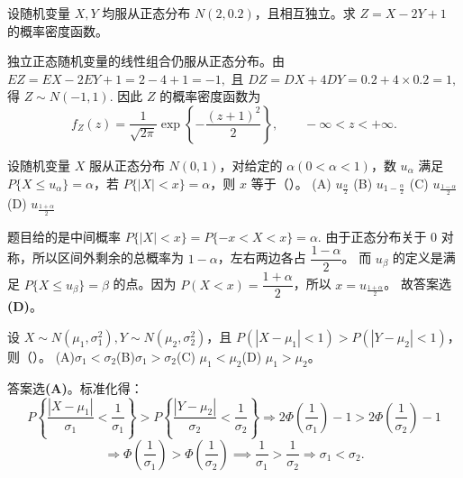 \documentclass[lang=cn,11pt]{elegantbook}
\begin{document}
\begin{exercise}\label{exer:src-2015-spring-a-i-03}
设随机变量 \(X,Y\) 均服从正态分布 \(N(2,0.2)\)，且相互独立。求
\(
Z=X-2Y+1
\)
的概率密度函数。
\end{exercise}
\begin{solution}
独立正态随机变量的线性组合仍服从正态分布。由
\(
EZ=EX-2EY+1=2-4+1=-1,
\)
且
\(
DZ=DX+4DY=0.2+4\times0.2=1,
\)
得
\(
Z\sim N(-1,1).
\)
因此 \(Z\) 的概率密度函数为
\[
f_Z(z)=\frac1{\sqrt{2\pi}}\exp\!\left\{-\frac{(z+1)^2}{2}\right\},
\qquad -\infty<z<+\infty.
\]
\end{solution}


\begin{exercise}\label{exer:2-12}\label{exer:src-2017-a-ii-05}
设随机变量 $X$ 服从正态分布 $N(0,1)$，对给定的 $\alpha(0<\alpha<1)$，数 $u_\alpha$ 满足 $P\{X\le u_\alpha\} = \alpha$，若 $P\{|X|<x\} = \alpha$，则 $x$ 等于（\quad）。
(A) $u_{\frac{\alpha}{2}}$ \quad (B) $u_{1-\frac{\alpha}{2}}$ \quad (C) $u_{\frac{1-\alpha}{2}}$ \quad (D) $u_{\frac{1+\alpha}{2}}$
\end{exercise}

\begin{solution}
题目给的是中间概率
\(
P\{|X|<x\}=P\{-x<X<x\}=\alpha.
\)
由于正态分布关于 0 对称，所以区间外剩余的总概率为 \(1-\alpha\)，左右两边各占 \(\dfrac{1-\alpha}{2}\)。
而 \(u_\beta\) 的定义是满足 \(P\{X\le u_\beta\}=\beta\) 的点。因为 \(P(X<x)=\dfrac{1+\alpha}{2}\)，所以 \(x=u_{\frac{1+\alpha}{2}}\)。
故答案选 \textbf{(D)}。
\end{solution}


\begin{exercise}[正态分布标准差比较]\label{exer:src-2015-spring-a-ii-05}
设 $X\sim N(\mu_1,\sigma_1^2), Y\sim N(\mu_2,\sigma_2^2)$，且 $P(|X-\mu_1|<1)>P(|Y-\mu_2|<1)$，则（\quad）。
(A)$\sigma_1<\sigma_2$\quad (B)$\sigma_1>\sigma_2$\quad (C) $\mu_1<\mu_2$\quad (D) $\mu_1>\mu_2$。
\end{exercise}
\begin{solution}
答案选\textbf{(A)}。标准化得：
\[
P\left\{\frac{|X-\mu_1|}{\sigma_1}<\frac{1}{\sigma_1}\right\}>P\left\{\frac{|Y-\mu_2|}{\sigma_2}<\frac{1}{\sigma_2}\right\}
\Rightarrow 2\Phi\left(\frac{1}{\sigma_1}\right)-1 > 2\Phi\left(\frac{1}{\sigma_2}\right)-1
\]
\[
\Rightarrow \Phi\left(\frac{1}{\sigma_1}\right)>\Phi\left(\frac{1}{\sigma_2}\right)\implies
\frac{1}{\sigma_1}>\frac{1}{\sigma_2} \Rightarrow \sigma_1<\sigma_2.
\]
\end{solution}
\end{document}
